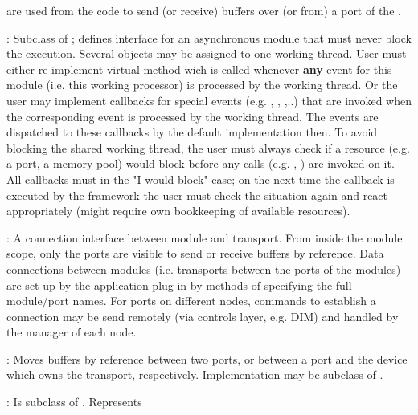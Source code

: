 \begin{description}
     are used from the  
    code to send (or receive) buffers over (or from) 
    a port of the .  
\item[\class{dabc::ModuleAsync}] : 
Subclass of ; defines interface for an 
   asynchronous module that must never block the execution. Several 
    objects may be assigned to one working thread. User must 
   either re-implement virtual method  wich is called 
   whenever {\bf any} event for this module (i.e. this working processor) 
   is processed by the working thread. Or the user may implement 
   callbacks for special events (e.g. , 
   , ,..) that are invoked when 
   the corresponding event is processed by the working thread. 
   The events are dispatched to these callbacks by the  
   default implementation then. To avoid blocking the shared working thread, 
   the user must always check if a resource (e.g. a port, a memory pool) 
   would block before any calls (e.g. , ) are invoked on it. 
   All callbacks must  in the "I would block" case; on the next 
   time the callback is executed by the framework the user must check the situation 
   again and react appropriately (might require own bookkeeping of available resources). 
\item[\class{dabc::Port}] : 
A connection interface between module and transport. 
   From inside the module scope, only the ports are visible to send or  receive 
   buffers by reference. Data connections between modules 
   (i.e. transports between the ports of the modules) are set up by 
   the application plug-in by methods of  specifying the full 
   module/port names. For ports on different nodes, commands to establish 
   a connection may be send remotely (via controls layer, e.g. DIM) and 
   handled by the manager of each node.  
\item[\class{dabc::Transport}] : 
Moves buffers by reference between two 
   ports, or between a port and the device which owns the 
   transport, respectively. Implementation may be subclass of .
\item[\class{dabc::Device}] : 
Is subclass of . Represents 

\end{description}
